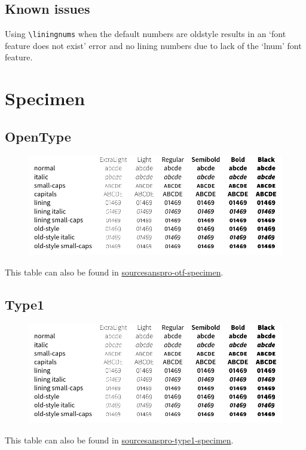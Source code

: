 \documentclass[10pt,a4paper,english]{article}
\newcommand*\file[1]{\href{run:#1.pdf}{#1}}
\begin{document}
\begin{multicols}{2}
\section{Known issues}
\begin{itemize*}
	\item Using \texttt{\textbackslash liningnums} when the default numbers are oldstyle results in an ‘font feature does not exist’ error and no lining numbers due to lack of the ‘lnum’ font feature.
\end{itemize*}

\newpage
\end{multicols}

\section{Specimen}
\label{sec:specimen}
\subsection{OpenType}
\begin{figure}[ht]
	\centering
	\includegraphics{sourcesanspro-otf-specimen}
\end{figure}
This table can also be found in \file{sourcesanspro-otf-specimen}.

\subsection{Type1}
\begin{figure}[ht]
	\centering
	\includegraphics{sourcesanspro-type1-specimen}
\end{figure}
This table can also be found in \file{sourcesanspro-type1-specimen}.
\end{document}
